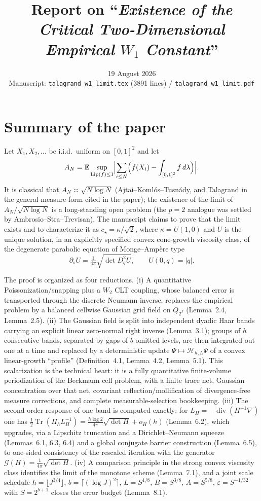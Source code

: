 \documentclass[11pt]{article}
\title{Report on ``\textit{Existence of the Critical Two-Dimensional Empirical $W_1$ Constant}''}
\date{19 August 2026 \\[2pt] \normalsize Manuscript: \texttt{talagrand\_w1\_limit.tex} (3891 lines) / \texttt{talagrand\_w1\_limit.pdf}}
\author{}
\newcommand{\E}{\mathbb{E}}
\begin{document}
\maketitle
\vspace{-2.5em}

\section*{Summary of the paper}

Let $X_1,X_2,\dots$ be i.i.d.\ uniform on $[0,1]^2$ and let
\[
  A_N=\E\sup_{\mathrm{Lip}(f)\le 1}
  \Bigl|\sum_{i\le N}\Bigl(f(X_i)-\int_{[0,1]^2} f\,d\lambda\Bigr)\Bigr|.
\]
It is classical that $A_N\asymp\sqrt{N\log N}$ (Ajtai--Koml\'os--Tusn\'ady, and Talagrand
in the general-measure form cited in the paper); the existence of the limit of
$A_N/\sqrt{N\log N}$ is a long-standing open problem (the $p=2$ analogue was settled by
Ambrosio--Stra--Trevisan). The manuscript claims to prove that the limit exists and to
characterize it as $c_\star=\kappa/\sqrt2$, where $\kappa=U(1,0)$ and $U$ is the unique
solution, in an explicitly specified convex cone-growth viscosity class, of the degenerate
parabolic equation of Monge--Amp\`ere type
\[
  \partial_sU=\tfrac1{4\pi}\sqrt{\det D_q^2U},\qquad U(0,q)=|q|.
\]

The proof is organized as four reductions. (i) A quantitative Poissonization/snapping plus a
$W_2$ CLT coupling, whose balanced error is transported through the discrete Neumann inverse,
replaces the empirical problem by a balanced cellwise Gaussian grid field on $Q_{2^J}$
(Lemma~2.4, Lemma~2.5). (ii) The Gaussian field is split into independent dyadic Haar bands
carrying an explicit linear zero-normal right inverse (Lemma~3.1); groups of $h$ consecutive
bands, separated by gaps of $b$ omitted levels, are then integrated out one at a time and
replaced by a deterministic update $\Psi\mapsto\mathcal H_{h,L}\Psi$ of a convex linear-growth
``profile'' (Definition~4.1, Lemma~4.2, Lemma~5.1). This scalarization is the technical heart:
it is a fully quantitative finite-volume periodization of the Beckmann cell problem, with a
finite trace net, Gaussian concentration over that net, covariant reflection/mollification of
divergence-free measure corrections, and complete measurable-selection bookkeeping. (iii) The
second-order response of one band is computed exactly: for $L_H=-\operatorname{div}(H^{-1}\nabla)$
one has $\tfrac12\operatorname{Tr}(\Pi_hL_H^{-1})=\frac{h\log2}{4\pi}\sqrt{\det H}+o_H(h)$
(Lemma~6.2), which upgrades, via a Lipschitz truncation and a Dirichlet--Neumann squeeze
(Lemmas~6.1, 6.3, 6.4) and a global conjugate barrier construction (Lemma~6.5), to one-sided
consistency of the rescaled iteration with the generator $\mathcal G(H)=\frac1{4\pi}\sqrt{\det H}$.
(iv) A comparison principle in the strong convex viscosity class identifies the limit of the
monotone scheme (Lemma~7.1), and a joint scale schedule $h=\lfloor J^{3/4}\rfloor$,
$b=\lceil(\log J)^2\rceil$, $L=S^{1/8}$, $B=S^{3/8}$, $A=S^{5/8}$, $\varepsilon=S^{-1/32}$ with
$S=2^{b+1}$ closes the error budget (Lemma~8.1).
\end{document}
